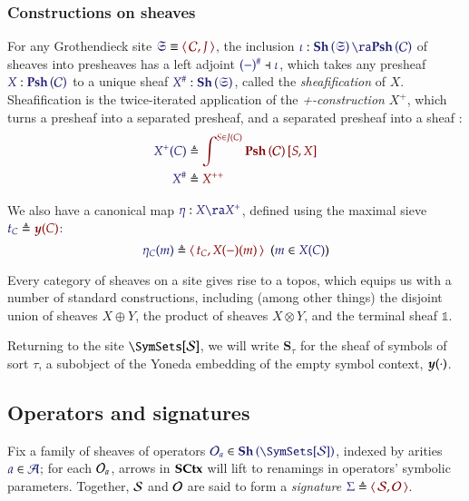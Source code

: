 \documentclass[11pt]{article}
\theoremstyle{definition}
\theoremstyle{remark}
\numberwithin{equation}{section}
\newcommand\Sheaves[1]{\mathbf{Sh}\left(#1\right)}
\newcommand\Presheaves[1]{\mathbf{Psh}\left(#1\right)}
\newcommand\Sheafify[1]{#1^{\#}}
\newcommand\SCtxSite{\SymSets[\Sorts]}
\begin{document}
\subsubsection{Constructions on sheaves}

For any Grothendieck site $\Match{\mathfrak{S}}{\Pair{\mathcal{C}}{J}}$, the
inclusion $\Of{\iota}{\Sheaves{\mathfrak{S}}\ra\Presheaves{\mathcal{C}}}$ of
sheaves into presheaves has a left adjoint
$\IMode{\Sheafify{(-)}}\dashv\IMode{\iota}$, which takes any presheaf
$\Of{X}{\Presheaves{\mathcal{C}}}$ to a unique sheaf
$\Of{\Sheafify{X}}{\Sheaves{\mathfrak{S}}}$, called the \emph{sheafification}
of $X$. Sheafification is the twice-iterated application of the
\emph{+-construction} $X^+$, which turns a presheaf into a separated presheaf,
and a separated presheaf into a sheaf \cite{mac-lane-moerdijk:1992}:
\begin{align*}
  \ADefine{
    X^+(C)
  }{
    \int^{S\in J(C)}
    \Hom{\Presheaves{\mathcal{C}}}{S}{X}
  }\\
  \ADefine{
    \Sheafify{X}
  }{
    X^{++}
  }
\end{align*}

We also have a canonical map $\Of{\eta}{X\ra X^+}$, defined
using the maximal sieve $\Define{t_C}{\Yoneda{C}}$:
\[
  \HypJ{
    \Define{\eta_C(m)}{
      \Pair{t_C}{
        X(-)(m)
      }
    }
  }{
    \Member{m}{X(C)}
  }
\]


Every category of sheaves on a site gives rise to a topos, which equips us with
a number of standard constructions, including (among other things) the disjoint
union of sheaves $X\oplus Y$, the product of sheaves $X\otimes Y$, and the terminal sheaf $\mathbb{1}$.

Returning to the site $\SCtxSite$, we will write $\mathbf{S}_\tau$ for the sheaf
of symbols of sort $\tau$, a subobject of the Yoneda embedding of the empty
symbol context, $\boldsymbol{y} (\cdot)$.

\subsection{Operators and signatures}

Fix a family of sheaves of operators
$\Member{\Operators_a}{\Sheaves{\SCtxSite}}$, indexed by arities
$\Member{a}{\Arities}$; for each $\mathcal{O}_a$, arrows in $\mathbf{SCtx}$ will lift to
renamings in operators' symbolic parameters. Together, $\mathcal{S}$ and $\mathcal{O}$ are said to form a \emph{signature}
$\Define{\Sigma}{\Pair{\Sorts}{\Operators}}$.
\end{document}
